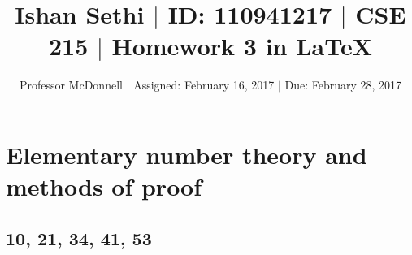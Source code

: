 \documentclass[11pt]{article}
\begin{document}
\title{\vspace{-.5in} Ishan Sethi $|$ ID: 110941217 $|$ CSE 215 $|$ Homework 3 in \LaTeX}
\author{Professor McDonnell $|$ Assigned: February 16, 2017 $|$ Due: February 28, 2017}
\date{}
\maketitle
\hrulefill
\tableofcontents

\section{Elementary number theory and methods of proof}
\subsection{10, 21, 34, 41, 53}
\end{document}

